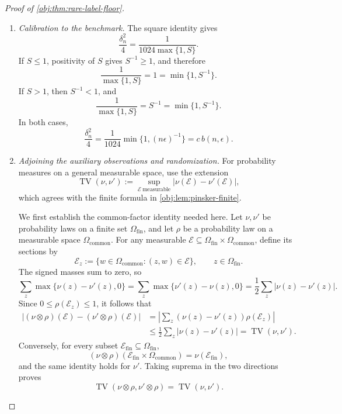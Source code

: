 \begin{proof}[Proof of \cref{obj:thm:rare-label-floor}]
\begin{enumerate}
\item \textit{Calibration to the benchmark.}
The square identity gives
\[
\frac{\delta_n^2}{4}
=
\frac1{1024\max\{1,S\}}.
\]
If \(S\le1\), positivity of \(S\) gives \(S^{-1}\ge1\), and therefore
\[
\frac1{\max\{1,S\}}=1=\min\{1,S^{-1}\}.
\]
If \(S>1\), then \(S^{-1}<1\), and
\[
\frac1{\max\{1,S\}}=S^{-1}=\min\{1,S^{-1}\}.
\]
In both cases,
\[
\frac{\delta_n^2}{4}
=
\frac1{1024}\min\{1,(n\epsilon)^{-1}\}
=
c\,b(n,\epsilon).
\]

\item \textit{Adjoining the auxiliary observations and randomization.}
For probability measures on a general measurable space, use the extension
\[
\operatorname{TV}(\nu,\nu')
:=
\sup_{\mathcal E\ \mathrm{measurable}}
|\nu(\mathcal E)-\nu'(\mathcal E)|,
\]
which agrees with the finite formula in \cref{obj:lem:pinsker-finite}.

We first establish the common-factor identity needed here. Let
\(\nu,\nu'\) be probability laws on a finite set
\(\Omega_{\mathrm{fin}}\), and let \(\rho\) be a probability law on a
measurable space \(\Omega_{\mathrm{common}}\). For any measurable
\(\mathcal E\subseteq
\Omega_{\mathrm{fin}}\times\Omega_{\mathrm{common}}\), define its sections by
\[
\mathcal E_z:=\{w\in\Omega_{\mathrm{common}}:(z,w)\in\mathcal E\},
\qquad z\in\Omega_{\mathrm{fin}}.
\]
The signed masses sum to zero, so
\[
\sum_z\max\{\nu(z)-\nu'(z),0\}
=
\sum_z\max\{\nu'(z)-\nu(z),0\}
=
\frac12\sum_z|\nu(z)-\nu'(z)|.
\]
Since \(0\le\rho(\mathcal E_z)\le1\), it follows that
\[
\begin{aligned}
|(\nu\otimes\rho)(\mathcal E)-(\nu'\otimes\rho)(\mathcal E)|
&=
\left|
\sum_z(\nu(z)-\nu'(z))\rho(\mathcal E_z)
\right|\\
&\le\frac12\sum_z|\nu(z)-\nu'(z)|
=\operatorname{TV}(\nu,\nu').
\end{aligned}
\]
Conversely, for every subset
\(\mathcal E_{\mathrm{fin}}\subseteq\Omega_{\mathrm{fin}}\),
\[
(\nu\otimes\rho)
(\mathcal E_{\mathrm{fin}}\times\Omega_{\mathrm{common}})
=
\nu(\mathcal E_{\mathrm{fin}}),
\]
and the same identity holds for \(\nu'\). Taking suprema in the two
directions proves
\[
\operatorname{TV}(\nu\otimes\rho,\nu'\otimes\rho)
=
\operatorname{TV}(\nu,\nu').
\]


\end{enumerate}
\end{proof}
